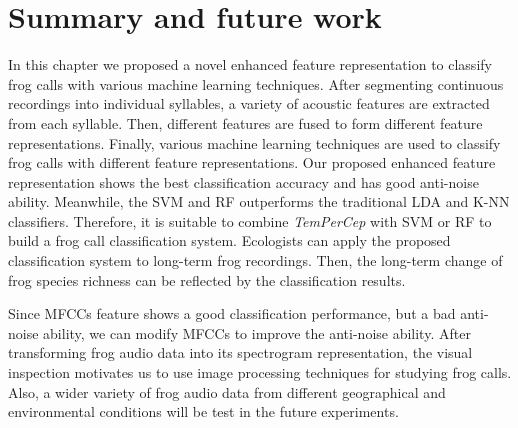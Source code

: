 \section{Summary and future work}
In this chapter we proposed a novel enhanced feature representation to classify frog calls with various machine learning techniques. After segmenting continuous recordings into individual syllables, a variety of acoustic features are extracted from each syllable. Then, different features are fused to form different feature representations. Finally, various machine learning techniques are used to classify frog calls with different feature representations.
Our proposed enhanced feature representation shows the best classification accuracy and has good anti-noise ability. Meanwhile, the SVM and RF outperforms the traditional LDA and K-NN classifiers. Therefore, it is suitable to combine \textit{TemPerCep} with SVM or RF to build a frog call classification system. Ecologists can apply the proposed classification system to long-term frog recordings. Then, the long-term change of frog species richness can be reflected by the classification results. 

Since MFCCs feature shows a good classification performance, but a bad anti-noise ability, we can modify MFCCs to improve the anti-noise ability. After transforming frog audio data into its spectrogram representation, the visual inspection motivates us to use image processing techniques for studying frog calls. Also, a wider variety of frog audio data from different geographical and environmental conditions will be test in the future experiments.
